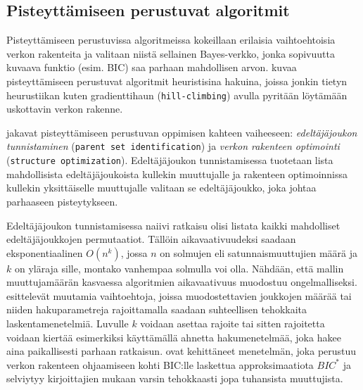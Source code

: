 \subsection{Pisteyttämiseen perustuvat algoritmit} 

Pisteyttämiseen perustuvissa algoritmeissa kokeillaan erilaisia vaihtoehtoisia verkon rakenteita ja valitaan niistä sellainen Bayes-verkko, jonka sopivuutta kuvaava funktio (esim. BIC) saa parhaan mahdollisen arvon. \citet{scutari_learning_2010} kuvaa pisteyttämiseen perustuvat algoritmit heuristisina hakuina, joissa jonkin tietyn heurustiikan kuten gradienttihaun (\texttt{hill-climbing}) avulla pyritään löytämään uskottavin verkon rakenne. 

\citet{scanagatta_survey_2019} jakavat pisteyttämiseen perustuvan oppimisen kahteen vaiheeseen: \emph{edeltäjäjoukon tunnistaminen} (\texttt{parent set identification}) ja \emph{verkon rakenteen optimointi} (\texttt{structure optimization}). Edeltäjäjoukon tunnistamisessa tuotetaan lista mahdollisista edeltäjäjoukoista kullekin muuttujalle ja rakenteen optimoinnissa kullekin yksittäiselle muuttujalle valitaan se edeltäjäjoukko, joka johtaa parhaaseen pisteytykseen.  

Edeltäjäjoukon tunnistamisessa naiivi ratkaisu olisi listata kaikki mahdolliset edeltäjäjoukkojen permutaatiot. Tällöin aikavaativuudeksi saadaan eksponentiaalinen $O(n^k)$, jossa $n$ on solmujen eli satunnaismuuttujien määrä ja $k$ on yläraja sille, montako vanhempaa solmulla voi olla. Nähdään, että mallin muuttujamäärän kasvaessa algoritmien aikavaativuus muodostuu ongelmalliseksi. \citet{scanagatta_survey_2019} esittelevät muutamia vaihtoehtoja, joissa muodostettavien joukkojen määrää tai niiden hakuparametreja rajoittamalla saadaan suhteellisen tehokkaita laskentamenetelmiä. Luvulle $k$ voidaan asettaa rajoite tai sitten rajoitetta voidaan kiertää esimerkiksi käyttämällä ahnetta hakumenetelmää, joka hakee aina paikallisesti parhaan ratkaisun. \citet{scanagatta_learning_2015} ovat kehittäneet menetelmän, joka perustuu verkon rakenteen ohjaamiseen kohti BIC:lle laskettua approksimaatiota $BIC^*$ ja selviytyy kirjoittajien mukaan varsin tehokkaasti jopa tuhansista muuttujista.  

